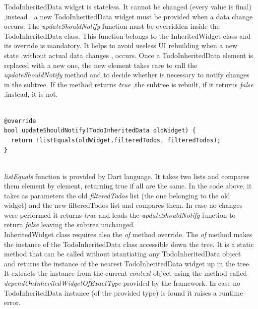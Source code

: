 TodoInheritedData widget is stateless. It cannot be changed (every value is final) ,instead , a new TodoInheritedData widget must be provided when a data change occurs. 
The \textit{updateShouldNotify }function must be overridden inside the TodoInheritedData class. This function belongs to the InheritedWidget class and its override is mandatory. It helps to avoid useless UI rebuilding when a new state ,without actual data changes , occurs. Once a TodoInheritedData element is replaced with a new one, the new element takes care to call the \textit{updateShouldNotify }method and to decide whether is necessary to notify changes in the subtree. If the method returns \textit{true },the subtree is rebuilt, if  it returns \textit{false} ,instead, it is not.
\mbox{}\\
\begin{code}
 \mbox{}

\begin{verbatim}

@override
bool updateShouldNotify(TodoInheritedData oldWidget) {
  return !listEquals(oldWidget.filteredTodos, filteredTodos);
}
\end{verbatim}
\end{code}
\mbox{}\\

\textit{listEquals }function is provided by Dart language. It takes two lists and compares them element by element, returning true if all are the same. In the code above, it takes as parameters the old \textit{filteredTodos} list (the one belonging to the old widget)  and the new filteredTodos list and compares them. In case no changes were performed it returns \textit{true} and leads the \textit{updateShouldNotify }function to return \textit{false} leaving the subtree unchanged.\\


InheritedWidget class requires also the \textit{of} method override. The \textit{of }method makes the instance of the TodoInheritedData class accessible down the tree. It is a static method that can be called without istantiating any TodoInheritedData object and returns the instance of the nearest TodoInheritedData widget up in the tree. It extracts the instance from the current \textit{context} object using the method called \textit{dependOnInheritedWidgetOfExactType} provided by the framework. In case no TodoInheritedData instance (of the provided type) is found it raises a runtime error.

